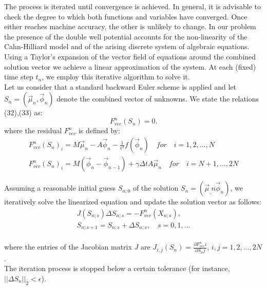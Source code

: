 \documentclass{article}
\begin{document}
The process is iterated until convergence is achieved. In general, it is advisable to check the degree to which both functions and variables have converged. Once either reaches machine accuracy, the other is unlikely to change. In our problem the presence of the double well potential accounts for the non-linearity of the Cahn-Hilliard model and of the arising discrete system of algebraic equations. Using a Taylor's expansion of the vector field of equations around the combined solution vector we achieve a linear approximation of the system. At each (fixed) time step $t_n$, we employ this iterative algorithm to solve it.\\
 Let us consider that a standard backward Euler scheme is applied and let $S_n = (\vec{\mu}_n, \vec{\phi}_n)$ denote the combined vector of unknowns. We state the relations (32),(33) as:
\begin{equation}
F^n_{vec}(S_n) = 0.
\end{equation}
where the residual $F^n_{vec}$ is defined by:
\begin{align}
F^n_{vec}(S_n)_i = M \vec{\mu}_n - A \vec{\phi}_{n} - \frac{1}{\epsilon^2}f(\vec{\phi}_{n})\quad for\quad i = 1, 2, \ldots, N\\
F^n_{vec}(S_n)_i = M(\vec{\phi}_{n}-\vec{\phi}_{n-1})+ \gamma \Delta t A \vec{\mu}_n \quad for\quad i = N+1, \ldots, 2N
\end{align}

Assuming a reasonable initial guess $S_{n;0}$ of the solution $S_n = (\vec{\mu}_,n \vec{\phi}_n)$, we iteratively solve the linearized equation and update the solution vector as follows:
\begin{align}
J(S_{n;s})\Delta S_{n;s} = -F^n_{vec}(X_{n;s}), \\ 
S_{n;s+1} = S_{n;s} + \Delta S_{n;s}, \quad s = 0, 1, \ldots
\end{align}\\

where the entries of the Jacobian matrix $J$ are $J_{i,j}(S_n) = \frac{\partial F^n_{vec}{i}}{\partial S_nj}$, $i, j = 1, 2, \ldots, 2N$.\\


The iteration process is stopped below a certain tolerance (for instance, $||\Delta S_n||_{2} < \epsilon$).\\
\end{document}
